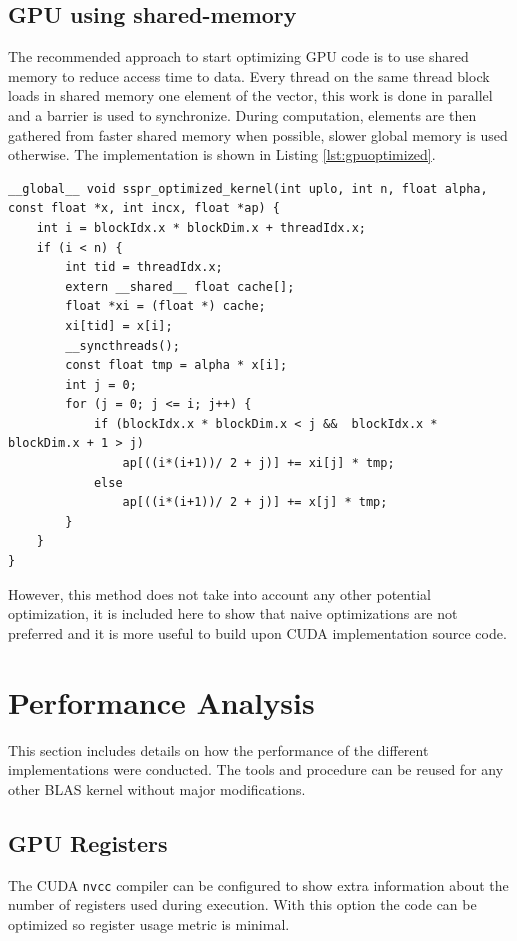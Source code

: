 \documentclass{llncs}
\begin{document}
\subsection{GPU using shared-memory}

The recommended approach to start optimizing GPU code is to use shared memory to reduce access time to data.
Every thread on the same thread block loads in shared memory one element of the vector, this work is done in parallel and a barrier is used to synchronize. During computation, elements are then gathered from faster shared memory when possible, slower global memory is used otherwise. The implementation is shown in Listing \ref{lst:gpuoptimized}.

\begin{lstlisting}[caption={Optimized SSPR GPU Implementation},label={lst:gpuoptimized}]
__global__ void sspr_optimized_kernel(int uplo, int n, float alpha, const float *x, int incx, float *ap) {
	int i = blockIdx.x * blockDim.x + threadIdx.x;
	if (i < n) {
		int tid = threadIdx.x;
		extern __shared__ float cache[];
		float *xi = (float *) cache;
		xi[tid] = x[i];
		__syncthreads();
		const float tmp = alpha * x[i];
		int j = 0;
		for (j = 0; j <= i; j++) {
			if (blockIdx.x * blockDim.x < j &&	blockIdx.x * blockDim.x + 1 > j)
				ap[((i*(i+1))/ 2 + j)] += xi[j] * tmp;
			else
				ap[((i*(i+1))/ 2 + j)] += x[j] * tmp;
		}
	}
}
\end{lstlisting}

However, this method does not take into account any other potential optimization, it is included here to show that naive optimizations are not preferred and it is more useful to build upon CUDA implementation source code.

\section{Performance Analysis}

This section includes details on how the performance of the different implementations were conducted. The tools and procedure can be reused for any other BLAS kernel without major modifications.

\subsection{GPU Registers}

The CUDA {\tt nvcc} compiler can be configured to show extra information about the number of registers used during execution. With this option the code can be optimized so register usage metric is minimal.
\end{document}
